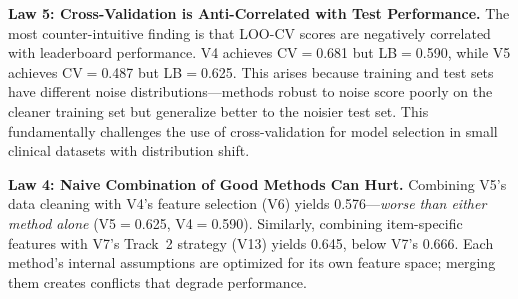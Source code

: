 \begin{table}[t]
    \centering
    \small
    \caption{\textbf{Twelve empirical laws} derived from systematic experimentation. Confidence rated on a 5-star scale based on the number of supporting experiments.}
    \label{tab:laws}
\end{table}

\noindent\textbf{Law 5: Cross-Validation is Anti-Correlated with Test Performance.}
The most counter-intuitive finding is that LOO-CV scores are negatively correlated with leaderboard performance. V4 achieves CV$=$0.681 but LB$=$0.590, while V5 achieves CV$=$0.487 but LB$=$0.625. This arises because training and test sets have different noise distributions---methods robust to noise score poorly on the cleaner training set but generalize better to the noisier test set. This fundamentally challenges the use of cross-validation for model selection in small clinical datasets with distribution shift.

\noindent\textbf{Law 4: Naive Combination of Good Methods Can Hurt.}
Combining V5's data cleaning with V4's feature selection (V6) yields 0.576---\textit{worse than either method alone} (V5$=$0.625, V4$=$0.590). Similarly, combining item-specific features with V7's Track~2 strategy (V13) yields 0.645, below V7's 0.666. Each method's internal assumptions are optimized for its own feature space; merging them creates conflicts that degrade performance.

